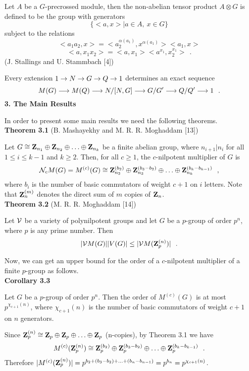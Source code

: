  Let $A$ be a $G$-precrossed module, then the non-abelian tensor product
$A\otimes G$ is defined to be the group with generators
$$ \{ <a,x>|a\in A,\ x\in G\}$$
subject to the relations
$$ <a_1a_2, x>=<a_2^{\alpha(a_1)},x^{\alpha(a_1)}><a_1,x> $$
$$<a,x_1x_2>=<a,x_1><a^{x_1},x_2^{x_1}>\ \ .$$
\hspace{-.2in}{\bf Theorem 2.12} (J. Stallings and U. Stammbach [4])

 Every extension $1\rightarrow N\rightarrow G\rightarrow Q\rightarrow 1$ determines an exact sequence
$$M(G)\longrightarrow M(Q)\longrightarrow N/[N,G]\longrightarrow G/G'\longrightarrow Q/Q'\longrightarrow 1\ \ .$$
{\bf 3. The Main Results}

 In order to present some main results we need the following theorems.\\
{\bf Theorem 3.1} (B. Mashayekhy and M. R. R. Moghaddam [13])

 Let $ G\cong {\bf Z}_{n_1}\oplus {\bf Z}_{n_2}\oplus \ldots \oplus {\bf
Z}_{n_k}$ be a finite abelian group,
where $n_{i+1}|n_i$ for all $1\leq i\leq k-1$ and $k\geq 2$.
Then, for all $c\geq 1$, the $c$-nilpotent multiplier of $G$ is
$$ {\cal N}_cM(G)=M^{(c)}(G)\cong {\bf Z}_{n_2}^{(b_2)}\oplus {\bf
Z}_{n_3}^{(b_3-b_2)}\oplus \ldots \oplus {\bf
Z}_{n_k}^{(b_k-b_{k-1})} \
\ ,$$ where $b_i$ is the number of basic commutators of weight $c+1$ on
$i$ letters. Note that ${\bf Z}_n^{(m)}$ denotes the direct sum of $m$ copies of
${\bf Z}_n$.\\
{\bf Theorem 3.2} (M. R. R. Moghaddam [14])

 Let $\cal V$ be a variety of polynilpotent groups and let $G$ be a $p$-group of
order $p^n$, where $p$ is any prime number. Then
$$ |{\cal V}M(G)||V(G)|\leq |{\cal V}M({\bf Z}_p^{(n)})|\ \ .$$

 Now, we can get an upper bound for the order of a $c$-nilpotent multiplier of a
finite $p$-group as follows.\\
{\bf Corollary 3.3}

 Let $G$  be a $p$-group of order $p^n$. Then the order of $M^{(c)}(G)$ is at
most $p^{\chi_{c+1}(n)}$, where $\chi_{c+1}(n)$ is the number of basic
commutators of weight $c+1$ on $n$ generators.\\
\hspace{-.2in}{\bf Proof.}

 Since
$ {\bf Z}_p^{(n)}\cong {\bf Z}_p\oplus {\bf Z}_p\oplus \ldots \oplus {\bf Z}_p$
 (n-copies), by Theorem 3.1 we have
$$ M^{(c)}({\bf Z}_p^{(n)})\cong {\bf Z}_p^{(b_2)}\oplus {\bf
Z}_p^{(b_3-b_2)}\oplus \ldots \oplus {\bf Z}_p^{(b_k-b_{k-1})}\ \ . $$
Therefore $|M^{(c)}({\bf Z}_p^{(n)})|=p^{b_2+(b_3-b_2)+\ldots
+(b_n-b_{n-1})}=p^{b_n}=p^{\chi_{c+1}(n)}$.

